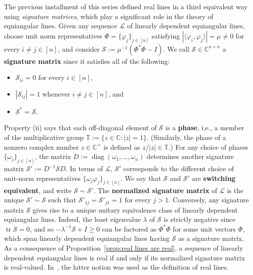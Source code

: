 The previous installment of this series defined real lines in a third equivalent way using \textit{signature matrices}, which play a significant role in the theory of equiangular lines.
Given any sequence $\mathscr{L}$ of linearly dependent equiangular lines, choose unit norm representatives $\Phi = \{ \varphi_j \}_{j\in [n]}$ satisfying $ | \langle \varphi_i, \varphi_j \rangle | = \mu \neq 0$ for every $i \neq j \in [n]$, and consider $\mathcal{S} := \mu^{-1}(\Phi^*\Phi - I)$.
We call $\mathcal{S} \in \mathbb{C}^{n \times n}$ a \textbf{signature matrix} since it satisfies all of the following:
\begin{itemize}
\item[(i)]
$\mathcal{S}_{ii} = 0$ for every $i \in [n]$,
\item[(ii)]
$| \mathcal{S}_{ij} | = 1$ whenever $i \neq j \in [n]$, and
\item[(iii)]
$\mathcal{S}^* = \mathcal{S}$.
\end{itemize}
Property (ii) says that each off-diagonal element of $\mathcal{S}$ is a \textbf{phase}, i.e., a member of the multiplicative group $\mathbb{T}:=\{ z \in \mathbb{C} : |z| = 1\}$.
(Similarly, the phase of a nonzero complex number $z \in \mathbb{C}^\times$ is defined as $z/|z| \in \mathbb{T}$.)
For any choice of phases $\{ \omega_j \}_{j \in [n]}$, the matrix $D := \operatorname{diag}(\omega_1,\dotsc,\omega_n)$ determines another signature matrix $\mathcal{S}' := D^{-1} \mathcal{S} D$.
In terms of $\mathscr{L}$, $\mathcal{S}'$ corresponds to the different choice of unit-norm representatives $\{ \omega_j \varphi_j \}_{j \in [n]}$.
We say that $\mathcal{S}$ and $\mathcal{S}'$ are \textbf{switching equivalent}, and write $\mathcal{S} \sim \mathcal{S}'$.
The \textbf{normalized signature matrix} of $\mathscr{L}$ is the unique $\mathcal{S}' \sim \mathcal{S}$ such that $\mathcal{S}'_{1j} =  \mathcal{S}'_{j1} = 1$ for every $j > 1$.
Conversely, any signature matrix $\mathcal{S}$ gives rise to a unique unitary equivalence class of linearly dependent equiangular lines.
Indeed, the least eigenvalue $\lambda$ of $\mathcal{S}$ is strictly negative since $\operatorname{tr} \mathcal{S} = 0$, and so $-\lambda^{-1} \mathcal{S} + I \geq 0$ can be factored as $\Phi^*\Phi$ for some unit vectors $\Phi$, which span linearly dependent equiangular lines having $\mathcal{S}$ as a signature matrix.
As a consequence of Proposition~\ref{prop:real lines are real}, a sequence of linearly dependent equiangular lines is real if and only if its normalized signature matrix is real-valued.
In~\cite{IversonM:18}, the latter notion was used as the definition of real lines.

